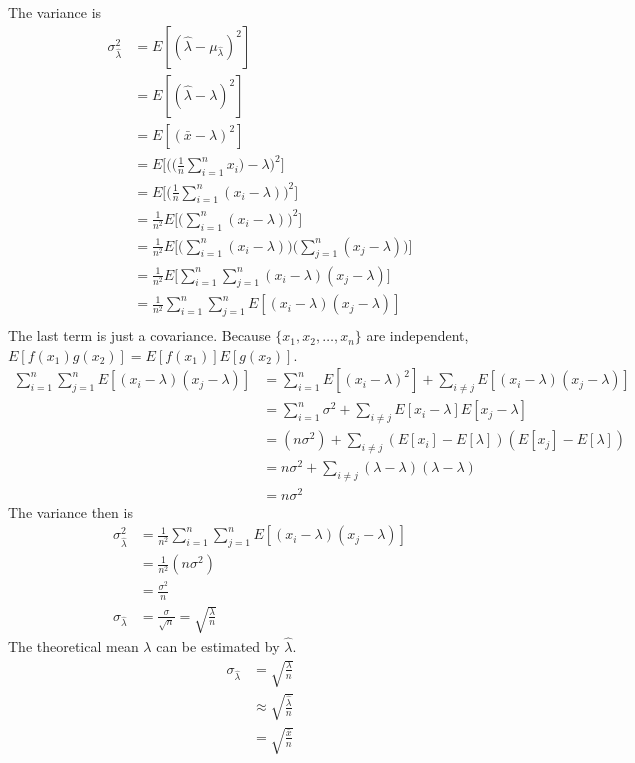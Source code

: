 \documentclass[12pt,a4paper]{report}
\begin{document}
The variance is
\begin{align*}
\sigma_{\hat{\lambda}}^2
&= E[(\hat{\lambda} - \mu_{\hat{\lambda}} )^2] \\
&= E[(\hat{\lambda} - \lambda )^2] \\
&= E[(\bar{x} - \lambda )^2] \\
&= E\Bigg [ \Bigg( \Bigg( \frac{1}{n} \sum_{i=1}^n x_i \Bigg) - \lambda \Bigg)^2 \Bigg] \\
&= E\Bigg [ \Bigg( \frac{1}{n} \sum_{i=1}^n (x_i - \lambda) \Bigg)^2 \Bigg] \\
&= \frac{1}{n^2} E\Bigg [ \Bigg( \sum_{i=1}^n (x_i - \lambda) \Bigg)^2 \Bigg] \\
&= \frac{1}{n^2} E\Bigg [ \Bigg( \sum_{i=1}^n (x_i - \lambda) \Bigg) \Bigg( \sum_{j=1}^n (x_j - \lambda) \Bigg) \Bigg] \\
&= \frac{1}{n^2} E\Bigg [ \sum_{i=1}^n \sum_{j=1}^n (x_i - \lambda) (x_j - \lambda) \Bigg] \\
&= \frac{1}{n^2} \sum_{i=1}^n \sum_{j=1}^n E[ (x_i - \lambda) (x_j - \lambda) ] \\
\end{align*}
The last term is just a covariance. Because $\{ x_1, x_2, \dots , x_n \}$ are independent, $E[f(x_1)g(x_2)] = E[f(x_1)] E[g(x_2)]$.
\begin{align}
\sum_{i=1}^n \sum_{j=1}^n E [ (x_i - \lambda) (x_j - \lambda) ]
&= \sum_{i=1}^n    E[ (x_i - \lambda)^2 ]
+  \sum_{i \neq j} E[ (x_i - \lambda) (x_j - \lambda) ] \\
&= \sum_{i=1}^n \sigma^2
+  \sum_{i \neq j} E[x_i - \lambda] E[x_j - \lambda] \\
&= (n \sigma^2)
+  \sum_{i \neq j} (E[x_i] - E[\lambda])( E[x_j] - E[\lambda]) \\
&= n \sigma^2
+  \sum_{i \neq j} (\lambda - \lambda)(\lambda - \lambda) \\
&= n \sigma^2 \label{expectation_covariance}
\end{align}
The variance then is
\begin{align*}
\sigma_{\hat{\lambda}}^2
&= \frac{1}{n^2} \sum_{i=1}^n \sum_{j=1}^n E[ (x_i - \lambda) (x_j - \lambda) ] \\
&= \frac{1}{n^2} (n \sigma^2) \\
&= \frac{\sigma^2}{n} \\
\sigma_{\hat{\lambda}} &= \frac{\sigma}{\sqrt{n}} = \sqrt{\frac{\lambda}{n}}
\end{align*}
The theoretical mean $\lambda$ can be estimated by $\hat{\lambda}$.
\begin{align*}
\sigma_{\hat{\lambda}}
&= \sqrt{\frac{\lambda}{n}} \\
&\approx \sqrt{\frac{\hat{\lambda}}{n}} \\
&= \sqrt{\frac{\bar{x}}{n}}
\end{align*}
\end{document}
